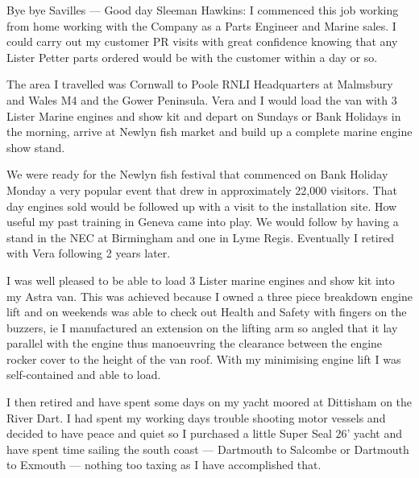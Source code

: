 Bye bye Savilles --- Good day Sleeman Hawkins: I commenced this job working
from home working with the Company as a Parts Engineer and Marine sales. I
could carry out my customer PR visits with great confidence knowing that any
Lister Petter parts ordered would be with the customer within a day or so.

The area I travelled was Cornwall to Poole RNLI Headquarters at Malmsbury and
Wales M4 and the Gower Peninsula. Vera and I would load the van with 3 Lister
Marine engines and show kit and depart on Sundays or Bank Holidays in the
morning, arrive at Newlyn fish market and build up a complete marine engine
show stand.

We were ready for the Newlyn fish festival that commenced on Bank Holiday Monday
a very popular event that drew in approximately 22,000 visitors. That day
engines sold would be followed up with a visit to the installation site. How
useful my past training in Geneva came into play. We would follow by having a
stand in the NEC at Birmingham and one in Lyme Regis. Eventually I retired
with Vera following 2 years later.

I was well pleased to be able to load 3 Lister marine engines and show kit into
my Astra van. This was achieved because I owned a three piece breakdown engine
lift and on weekends was able to check out Health and Safety with fingers on
the buzzers, ie I manufactured an extension on the lifting arm so angled that
it lay parallel with the engine thus manoeuvring the clearance between the
engine rocker cover to the height of the van roof. With my minimising engine
lift I was self-contained and able to load.






I then retired and have spent some days on my yacht moored at Dittisham on the
River Dart. I had spent my working days trouble shooting motor vessels and
decided to have peace and quiet so I purchased a little Super Seal 26' yacht
and have spent time sailing the south coast --- Dartmouth to Salcombe or
Dartmouth to Exmouth --- nothing too taxing as I have accomplished that.

